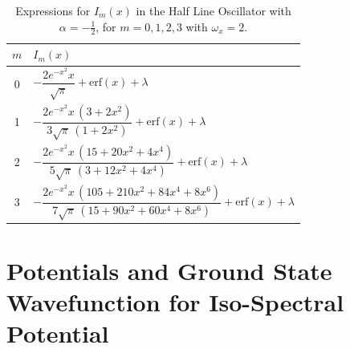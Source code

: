 \documentclass[12pt]{article}
\begin{document}
\begin{table}[h!]
\centering
\setlength{\tabcolsep}{1em}
\renewcommand{\arraystretch}{1.6}
\begin{tabular}{c|l}
\hline
$m$ & $I_m(x)$ \\ \hline
0 & $-\dfrac{2 e^{-x^2}x}{\sqrt{\pi}} + \mathrm{erf}(x) + \lambda$ \\[0.8em]

1 & $-\dfrac{2 e^{-x^2}x \,(3+2x^2)}{3\sqrt{\pi}\,(1+2x^2)} + \mathrm{erf}(x) + \lambda$ \\[0.8em]

2 & $-\dfrac{2 e^{-x^2}x \,(15+20x^2+4x^4)}{5\sqrt{\pi}\,(3+12x^2+4x^4)} + \mathrm{erf}(x) + \lambda$ \\[0.8em]

3 & $-\dfrac{2 e^{-x^2}x \,(105+210x^2+84x^4+8x^6)}{7\sqrt{\pi}\,(15+90x^2+60x^4+8x^6)} + \mathrm{erf}(x) + \lambda$ \\ \hline
\end{tabular}
\caption{Expressions for $I_m(x)$ in the Half Line Oscillator with $\alpha=-\tfrac{1}{2}$, for $m=0,1,2,3$ with $\omega_x=2$.}
\label{tab:I0-halfline-neg}
\end{table}

\newpage

\section*{Potentials and Ground State Wavefunction for Iso-Spectral Potential}
\end{document}
